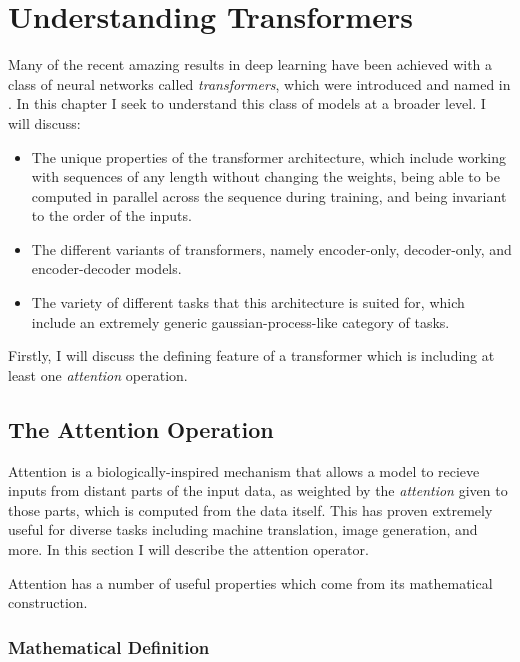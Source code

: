 \chapter{Understanding Transformers}
\label{C:transformers}

Many of the recent amazing results in deep learning have been achieved with a class of neural networks called \textit{transformers}, which were introduced and named in \cite{attention-is-all-you-need}. In this chapter I seek to understand this class of models at a broader level. I will discuss:

\begin{itemize}
    \item The unique properties of the transformer architecture, which include working with sequences of any length without changing the weights, being able to be computed in parallel across the sequence during training, and being invariant to the order of the inputs.
    \item The different variants of transformers, namely encoder-only, decoder-only, and encoder-decoder models.
    \item The variety of different tasks that this architecture is suited for, which include an extremely generic gaussian-process-like category of tasks.
\end{itemize}

Firstly, I will discuss the defining feature of a transformer which is including at least one \textit{attention} operation.

\section{The Attention Operation}

Attention is a biologically-inspired mechanism that allows a model to recieve inputs from distant parts of the input data, as weighted by the \textit{attention} given to those parts, which is computed from the data itself. This has proven extremely useful for diverse tasks including machine translation, image generation, and more. In this section I will describe the attention operator.

Attention has a number of useful properties which come from its mathematical construction.

\subsection{Mathematical Definition}

